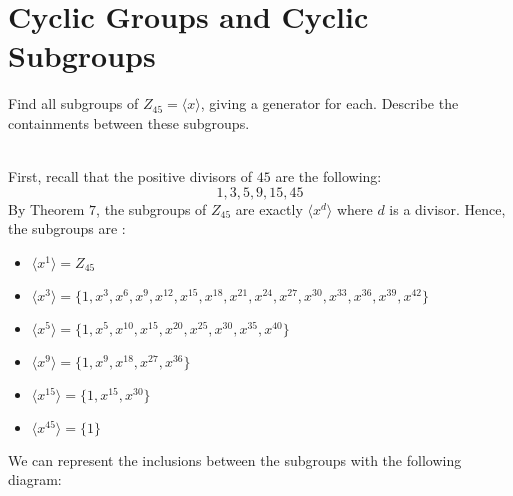 \section{Cyclic Groups and Cyclic Subgroups}

\begin{exercise}
    Find all subgroups of $Z_{45}=\langle x\rangle$, giving a generator for
    each. Describe the containments between these subgroups.\\
\end{exercise}

\begin{solution}
    \\ First, recall that the positive divisors of $45$ are the following:
    $$1, 3, 5, 9, 15, 45$$
    By Theorem $7$, the subgroups of $Z_{45}$ are exactly $\langle x^d\rangle$
    where $d$ is a divisor. Hence, the subgroups are :
    \begin{itemize}
        \item $\langle x^1\rangle = Z_{45}$
        \item $\langle x^3\rangle = \{1, x^3, x^6, x^9, x^{12}, x^{15},
        x^{18}, x^{21}, x^{24}, x^{27}, x^{30}, x^{33}, x^{36}, x^{39},
        x^{42}\}$
        \item $\langle x^5\rangle = \{1, x^5, x^{10}, x^{15}, x^{20},
        x^{25}, x^{30}, x^{35}, x^{40}\}$
        \item $\langle x^9\rangle = \{1, x^9, x^{18}, x^{27}, x^{36}\}$
        \item $\langle x^{15}\rangle = \{1, x^{15}, x^{30}\}$
        \item $\langle x^{45}\rangle = \{1\}$
    \end{itemize}
    We can represent the inclusions between the subgroups with the following
    diagram:
    \begin{center}
    \end{center}
\end{solution}

